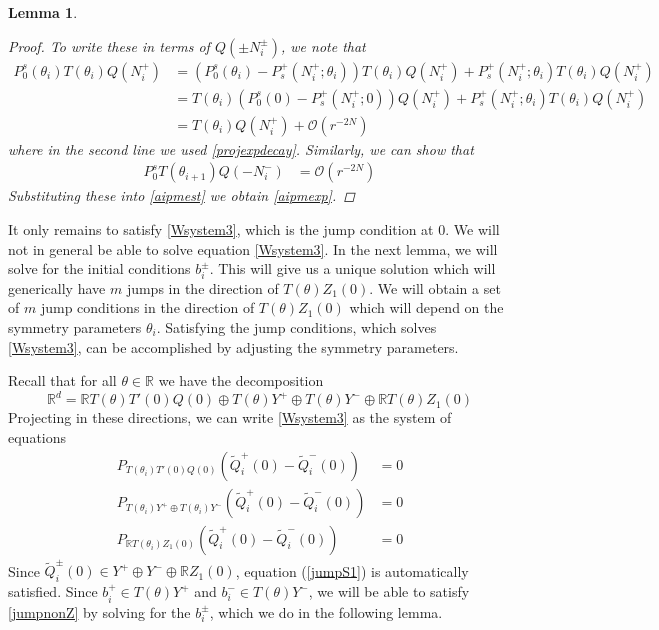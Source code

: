 \documentclass[12pt]{article}
\def\R{{\mathbb R}}
\newtheorem{lemma}{Lemma}
\begin{document}
\begin{lemma}
\begin{proof}
To write these in terms of $Q(\pm N_i^\pm)$, we note that
\begin{align*}
P_0^s(\theta_i) T(\theta_i) Q(N_i^+) &= (P_0^s(\theta_i) - P_s^+(N_i^+; \theta_i)) T(\theta_i) Q(N_i^+) + P_s^+(N_i^+; \theta_i) T(\theta_i) Q(N_i^+) \\
&= T(\theta_i)(P_0^s(0) - P_s^+(N_i^+; 0)) Q(N_i^+) + P_s^+(N_i^+; \theta_i) T(\theta_i) Q(N_i^+) \\
&= T(\theta_i) Q(N_i^+) + \mathcal{O}(r^{-2N}) 
\end{align*}
where in the second line we used \eqref{projexpdecay}. Similarly, we can show that 
\begin{align*}
P_0^s T(\theta_{i+1}) Q(-N_i^-) &= \mathcal{O}(r^{-2N})
\end{align*}
Substituting these into \eqref{aipmest} we obtain \eqref{aipmexp}.
\end{proof}
\end{lemma}

It only remains to satisfy \eqref{Wsystem3}, which is the jump condition at 0. We will not in general be able to solve equation \eqref{Wsystem3}. In the next lemma, we will solve for the initial conditions $b_i^\pm$. This will give us a unique solution which will generically have $m$ jumps in the direction of $T(\theta) Z_1(0)$. We will obtain a set of $m$ jump conditions in the direction of $T(\theta) Z_1(0)$ which will depend on the symmetry parameters $\theta_i$. Satisfying the jump conditions, which solves \eqref{Wsystem3}, can be accomplished by adjusting the symmetry parameters.

Recall that for all $\theta \in \R$ we have the decomposition
\[
\R^d = \R T(\theta) T'(0)Q(0) \oplus T(\theta) Y^+ \oplus T(\theta) Y^- \oplus \R T(\theta) Z_1(0)
\]
Projecting in these directions, we can write \eqref{Wsystem3} as the system of equations
\begin{align}
P_{T(\theta_i)T'(0)Q(0)}\left( \tilde{Q}_i^+(0) - \tilde{Q}_i^-(0) \right) &= 0 \label{jumpS1} \\
P_{T(\theta_i)Y^+ \oplus T(\theta_i)Y^-}\left( \tilde{Q}_i^+(0) - \tilde{Q}_i^-(0) \right) &= 0 \label{jumpnonZ} \\
P_{\R T(\theta_i)Z_1(0)} \left( \tilde{Q}_i^+(0) - \tilde{Q}_i^-(0) \right) &= 0 \label{jumpZ}
\end{align}
Since $\tilde{Q}_i^\pm(0) \in Y^+ \oplus Y^- \oplus \R Z_1(0)$, equation (\ref{jumpS1}) is automatically satisfied. Since $b_i^+ \in T(\theta) Y^+$ and $b_i^- \in T(\theta) Y^-$, we will be able to satisfy \eqref{jumpnonZ} by solving for the $b_i^\pm$, which we do in the following lemma.
\end{document}

